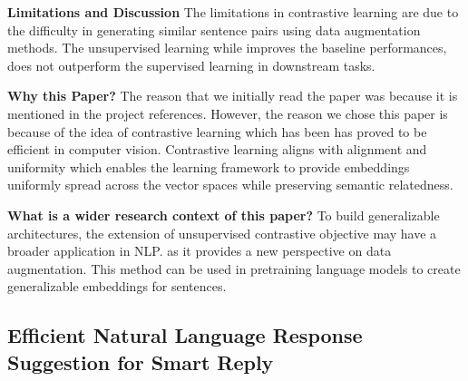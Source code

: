 \documentclass{article}
\begin{document}
\textbf{Limitations and Discussion}
The limitations in contrastive learning are due to the difficulty in generating similar sentence pairs using data augmentation methods. The unsupervised learning while improves the baseline performances, does not outperform the supervised learning in downstream tasks.

\textbf{Why this Paper?}
The reason that we initially read the paper was because it is mentioned in the project references.  However, the reason we chose this paper is because of the idea of contrastive learning which has been has proved to be efficient in computer vision. Contrastive learning aligns with alignment and uniformity which enables the learning framework to provide embeddings uniformly spread across the vector spaces while preserving semantic relatedness.

\textbf{ What is a wider research context of this paper?}
To build generalizable architectures, the extension of unsupervised contrastive objective may have a broader application in NLP. as it provides a new perspective on data augmentation. This method can be used in pretraining language models to create generalizable embeddings for sentences.  

\subsection{Efficient Natural Language Response Suggestion
for Smart Reply \cite{smart-reply}}




\end{document}
